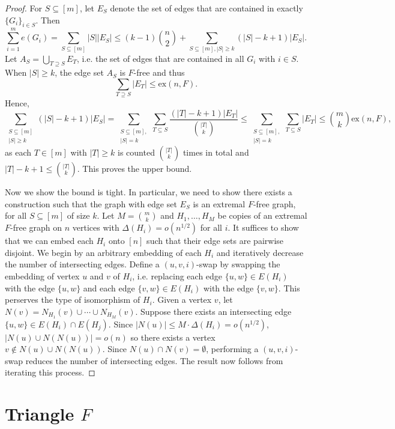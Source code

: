 \documentclass[12pt]{report}
\begin{document}
\begin{proof}
  For $S \subseteq [m]$, let $E_S$ denote the set of edges that are contained in exactly $\{G_i\}_{i
  \in S}$. Then 
  \[
    \sum_{i = 1}^m e(G_i) = \sum_{S \subseteq [m]} |S||E_S| \leq (k - 1)\binom{n}{2} + \sum_{S \subseteq [m], |S| \geq k} (|S| - k + 1)|E_S|.
  \]
  Let $A_S = \bigcup_{T \supseteq S} E_T$, i.e. the set of edges that are contained in all $G_i$
  with $i \in S$. When $|S| \geq k$, the edge set $A_S$ is $F$-free and thus 
  \[
    \sum_{T \supseteq S} |E_T| \leq \text{ex}(n, F).
  \]
  Hence,
  \[
    \sum_{\substack{S \subseteq [m] \\ |S| \geq k}} (|S| - k + 1)|E_S| = \sum_{\substack{S \subseteq [m], \\ |S| = k}} \sum_{T \subseteq S} \frac{(|T| - k + 1)|E_T|}{\binom{|T|}{k}} \leq \sum_{\substack{S \subseteq [m], \\ |S| = k}} \sum_{T \subseteq S} |E_T| \leq \binom{m}{k}\text{ex}(n, F),
  \]
  as each $T \in [m]$ with $|T| \geq k$ is counted $\binom{|T|}{k}$ times in total and $|T| - k + 1
  \leq \binom{|T|}{k}$. This proves the upper bound.

  Now we show the bound is tight. In particular, we need to show there exists a construction such
  that the graph with edge set $E_S$ is an extremal $F$-free graph, for all $S \subseteq [m]$ of
  size $k$. Let $M = \binom{m}{k}$ and $H_1, \ldots, H_M$ be copies of an extremal $F$-free graph on
  $n$ vertices with $\Delta(H_i) = o(n^{1/2})$ for all $i$. It suffices to show that we can embed
  each $H_i$ onto $[n]$ such that their edge sets are pairwise disjoint. We begin by an arbitrary
  embedding of each $H_i$ and iteratively decrease the number of intersecting edges. Define a $(u,
  v, i)$-swap by swapping the embedding of vertex $u$ and $v$ of $H_i$, i.e. replacing each edge
  $\{u, w\} \in E(H_i)$ with the edge $\{u, w\}$ and each edge $\{v, w\} \in E(H_i)$ with the edge
  $\{v, w\}$. This perserves the type of isomorphism of $H_i$. Given a vertex $v$, let $N(v) =
  N_{H_1}(v) \cup \cdots \cup N_{H_M}(v)$. Suppose there exists an intersecting edge $\{u, w\} \in
  E(H_i) \cap E(H_j)$. Since $|N(u)| \leq M \cdot \Delta(H_i) = o(n^{1/2})$, $|N(u) \cup N(N(u))| =
  o(n)$ so there exists a vertex $v \notin N(u) \cup N(N(u))$. Since $N(u) \cap N(v) = \emptyset$,
  performing a $(u, v, i)$-swap reduces the number of intersecting edges. The result now follows
  from iterating this process.
\end{proof}


\section{Triangle $F$}
\end{document}
